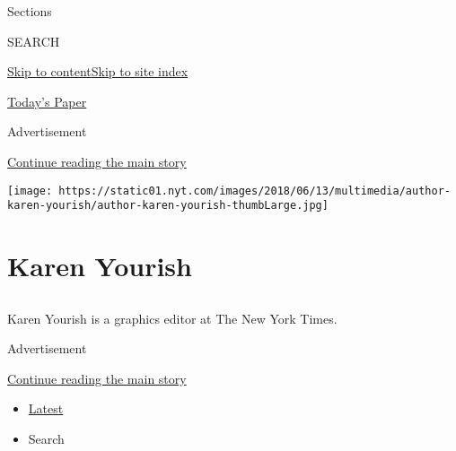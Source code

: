Sections

SEARCH

\protect\hyperlink{site-content}{Skip to
content}\protect\hyperlink{site-index}{Skip to site index}

\href{https://myaccount.nytimes.com/auth/login?response_type=cookie\&client_id=vi}{}

\href{https://www.nytimes.com/section/todayspaper}{Today's Paper}

Advertisement

\protect\hyperlink{after-top}{Continue reading the main story}

\texttt{[image: https://static01.nyt.com/images/2018/06/13/multimedia/author-karen-yourish/author-karen-yourish-thumbLarge.jpg]}

\hypertarget{karen-yourish}{%
\section{Karen Yourish}\label{karen-yourish}}

\subsection{}

Karen Yourish is a graphics editor at The New York Times.

Advertisement

\protect\hyperlink{after-mid1}{Continue reading the main story}

\begin{itemize}
\tightlist
\item
  \protect\hyperlink{stream-panel}{Latest}
\item
  Search
\end{itemize}

